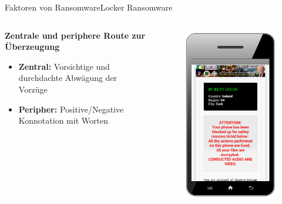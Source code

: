 \documentclass[10pt]{beamer}
\begin{document}
\begin{frame}{Faktoren von Ransomware}{Locker Ransomware}
\begin{columns}
\begin{column}{6cm}
\textbf{Zentrale und periphere Route zur Überzeugung}
\begin{itemize}
\item \textbf{Zentral:} Vorsichtige und durchdachte Abwägung der Vorzüge
\item \textbf{Peripher:} Positive/Negative Konnotation mit Worten
\end{itemize}
\end{column}
\begin{column}{5cm}
\begin{figure}[p]
		\centering
		\includegraphics[scale=0.3]{Lockdroid.png}

	\end{figure}
\end{column}
\end{columns}


\end{frame}
\end{document}
